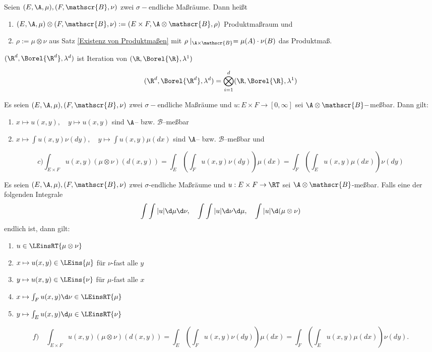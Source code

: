 \documentclass[11pt, a4paper]{article}
\begin{document}
\begin{definition}
    Seien $(E,\A,\mu), (F,\mathscr{B},\nu)$ zwei $\sigma-$endliche Maßräume. Dann heißt
    \begin{enumerate}[label=\roman*)]
        \item $(E,\A,\mu)\otimes(F,\mathscr{B},\nu):=(E\times F, \A \otimes \mathscr{B}, \rho)$ Produktmaßraum und
        \item $\rho:= \mu\otimes \nu$ aus Satz \ref{Existenz von Produktmaßen} mit $\rho \mid _{\A\times \mathscr{B}} = \mu(A)\cdot \nu(B)$ das Produktmaß.
    \end{enumerate}
\end{definition}

\begin{corollary}
    $(\R^d, \Borel{\R^d}, \lambda ^d)$ ist Iteration von $(\R, \Borel{\R}, \lambda^1)$

    $$(\R^d, \Borel{\R^d}, \lambda ^d) = \bigotimes_{i=1}^d (\R, \Borel{\R}, \lambda^1) $$
\end{corollary}

\begin{theorem} 
Es seien $(E,\A,\mu), (F,\mathscr{B},\nu)$ zwei $\sigma-$endliche Maßräume und $u:E\times F \to [0,\infty]$ sei $\A\otimes \mathscr{B}-$meßbar. Dann gilt:
\begin{enumerate}[label=\alph*)]
    \item $x\mapsto u(x,y), \quad y\mapsto u(x,y)$ sind $\A$-- bzw. $\mathscr{B}$--meßbar
    \item $x\mapsto \int u(x,y) \nu(dy), \quad y\mapsto \int u(x,y)\mu(dx)$ sind $\A$-- bzw. $\mathscr{B}$--meßbar und
\end{enumerate}
 $$c)\int_{E\times F} u(x,y) (\mu\otimes \nu)(d(x,y)) = \int_E \left( \int_F u(x,y)\nu(dy) \right) \mu(dx)= \int_F \left( \int_E u(x,y)\mu(dx) \right) \nu(dy) $$
\end{theorem}

\begin{corollary} 
Es seien $(E,\A,\mu), (F,\mathscr{B},\nu)$ zwei $\sigma$-endliche Maßräume und $u:E\times F \to \RT$ sei $\A\otimes \mathscr{B}$-meßbar. Falls eine der folgenden Integrale 
$$\int \int |u| \d\mu\d\nu, \quad \int \int |u| \d\nu\d\mu, \quad \int |u| \d(\mu\otimes \nu)$$
endlich ist, dann gilt:
\begin{enumerate}[label=\alph*)]
    \item $u\in\LEinsRT{\mu\otimes \nu}$
    \item $x\mapsto u(x,y)\in \LEins{\mu}$ für $\nu$-fast alle $y$
    \item $y\mapsto u(x,y)\in\LEins{\nu}$ für $\mu$-fast alle $x$
    \item $x\mapsto \int_F u(x,y)\d\nu \in \LEinsRT{\mu}$
    \item $y\mapsto \int_E u(x,y)\d\mu \in \LEinsRT{\nu}$
\end{enumerate}
$$f)\quad
\int_{E\times F} u(x,y)(\mu\otimes \nu)(d(x,y))
= \int_E \left( \int_F u(x,y)\nu(dy) \right)\mu(dx)
= \int_F \left( \int_E u(x,y)\mu(dx) \right)\nu(dy).$$
\end{corollary}
\end{document}
